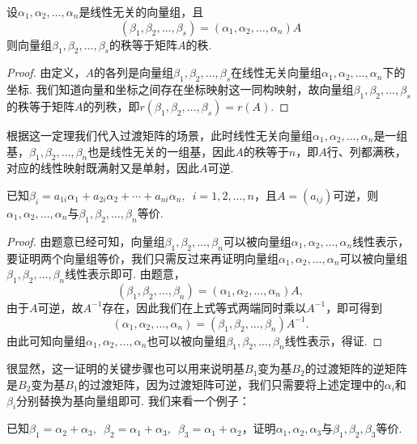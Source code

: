 \begin{theorem}
    设$\alpha_1,\alpha_2,\ldots,\alpha_n$是线性无关的向量组，且
    \[(\beta_1,\beta_2,\ldots,\beta_s)=(\alpha_1,\alpha_2,\ldots,\alpha_n)A\]
    则向量组$\beta_1,\beta_2,\ldots,\beta_s$的秩等于矩阵$A$的秩.
\end{theorem}

\begin{proof}
    由定义，$A$的各列是向量组$\beta_1,\beta_2,\ldots,\beta_s$在线性无关向量组$\alpha_1,\alpha_2,\ldots,\alpha_n$下的坐标. 我们知道向量和坐标之间存在坐标映射这一同构映射，故向量组$\beta_1,\beta_2,\ldots,\beta_s$的秩等于矩阵$A$的列秩，即$r(\beta_1,\beta_2,\ldots,\beta_s)=r(A)$.
\end{proof}

根据这一定理我们代入过渡矩阵的场景，此时线性无关向量组$\alpha_1,\alpha_2,\ldots,\alpha_n$是一组基，$\beta_1,\beta_2,\ldots,\beta_n$也是线性无关的一组基，因此$A$的秩等于$n$，即$A$行、列都满秩，对应的线性映射既满射又是单射，因此$A$可逆.
\begin{theorem}
    已知$\beta_i=a_{1i}\alpha_1+a_{2i}\alpha_2+\cdots+a_{ni}\alpha_n,\enspace i=1,2,\ldots,n$，且$A=(a_{ij})$可逆，则$\alpha_1,\alpha_2,\ldots,\alpha_n$与$\beta_1,\beta_2,\ldots,\beta_n$等价.
\end{theorem}

\begin{proof}
    由题意已经可知，向量组$\beta_1,\beta_2,\ldots,\beta_n$可以被向量组$\alpha_1,\alpha_2,\ldots,\alpha_n$线性表示，要证明两个向量组等价，我们只需反过来再证明向量组$\alpha_1,\alpha_2,\ldots,\alpha_n$可以被向量组$\beta_1,\beta_2,\ldots,\beta_n$线性表示即可. 由题意，
    \[(\beta_1,\beta_2,\ldots,\beta_n)=(\alpha_1,\alpha_2,\ldots,\alpha_n)A,\]
    由于$A$可逆，故$A^{-1}$存在，因此我们在上式等式两端同时乘以$A^{-1}$，即可得到
    \[(\alpha_1,\alpha_2,\ldots,\alpha_n)=(\beta_1,\beta_2,\ldots,\beta_n)A^{-1}.\]
    由此可知向量组$\alpha_1,\alpha_2,\ldots,\alpha_n$也可以被向量组$\beta_1,\beta_2,\ldots,\beta_n$线性表示，得证.
\end{proof}

很显然，这一证明的关键步骤也可以用来说明基$B_1$变为基$B_2$的过渡矩阵的逆矩阵是$B_2$变为基$B_1$的过渡矩阵，因为过渡矩阵可逆，我们只需要将上述定理中的$\alpha_i$和$\beta_i$分别替换为基向量组即可. 我们来看一个例子：
\begin{example}
    已知$\beta_1=\alpha_2+\alpha_3,\enspace\beta_2=\alpha_1+\alpha_3,\enspace\beta_3=\alpha_1+\alpha_2$，证明$\alpha_1,\alpha_2,\alpha_3$与$\beta_1,\beta_2,\beta_3$等价.
\end{example}

